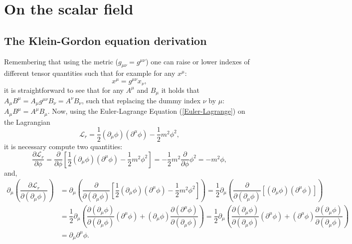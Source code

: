 \clearpage
\section{On the scalar field}
\label{app:B}


\subsection{The Klein-Gordon equation derivation}

Remembering that using the metric ($g_{\mu\nu}=g^{\mu\nu}$) one can raise or lower indexes of different tensor quantities such that for example for any $x^{\mu}$:
\begin{equation*}
    x^{\mu} = g^{\mu\nu}x_{\nu},
\end{equation*}
it is straightforward to see that for any $A^{\mu}$ and $B_{\mu}$ it holds that $A_{\mu}B^{\mu} = A_{\mu}g^{\mu\nu}B_{\nu} = A^{\nu}B_{\nu}$, such that replacing the dummy index $\nu$ by $\mu$: $A_{\mu}B^{\mu} = A^{\mu}B_{\mu}$. Now, using the Euler-Lagrange Equation (\ref{Euler-Lagrange}) on the Lagrangian
\begin{equation*}
    \mathcal{L}_r = \dfrac{1}{2}(\partial_{\mu}\phi)(\partial^{\mu}\phi) - \dfrac{1}{2}m^2\phi^2,
\end{equation*}
it is necessary compute two quantities:
\begin{equation}
\label{firsttermkg}
    \dfrac{\partial \mathcal{L}_r}{\partial\phi} = \dfrac{\partial}{\partial\phi}\left[\dfrac{1}{2}(\partial_{\mu}\phi)(\partial^{\mu}\phi) - \dfrac{1}{2}m^2\phi^2\right] = -\dfrac{1}{2}m^2 \dfrac{\partial}{\partial\phi}\phi^2 = -m^2\phi,
\end{equation}
and,
\begin{align}
    \partial_{\mu}\left(\dfrac{\partial\mathcal{L}_r}{\partial(\partial_{\mu}\phi)}\right) &= \partial_{\mu}\left(\dfrac{\partial}{\partial(\partial_{\mu}\phi)}\left[\dfrac{1}{2}(\partial_{\mu}\phi)(\partial^{\mu}\phi) - \dfrac{1}{2}m^2\phi^2\right]\right) = \dfrac{1}{2}\partial_{\mu} \left(\dfrac{\partial}{\partial(\partial_{\mu}\phi)}\left[(\partial_{\mu}\phi)(\partial^{\mu}\phi)\right]\right) \nonumber \\
    &= \dfrac{1}{2}\partial_{\mu}\left(\dfrac{\partial(\partial_{\mu}\phi)}{\partial(\partial_{\mu}\phi)}(\partial^{\mu}\phi) + (\partial_{\mu}\phi)\dfrac{\partial(\partial^{\mu}\phi)}{\partial(\partial_{\mu}\phi)}\right) = \dfrac{1}{2}\partial_{\mu}\left(\dfrac{\partial(\partial_{\mu}\phi)}{\partial(\partial_{\mu}\phi)}(\partial^{\mu}\phi) + (\partial^{\mu}\phi)\dfrac{\partial(\partial_{\mu}\phi)}{\partial(\partial_{\mu}\phi)}\right) \nonumber \\
\label{secondtermkg}
    &= \partial_{\mu}\partial^{\mu}\phi.
\end{align}

